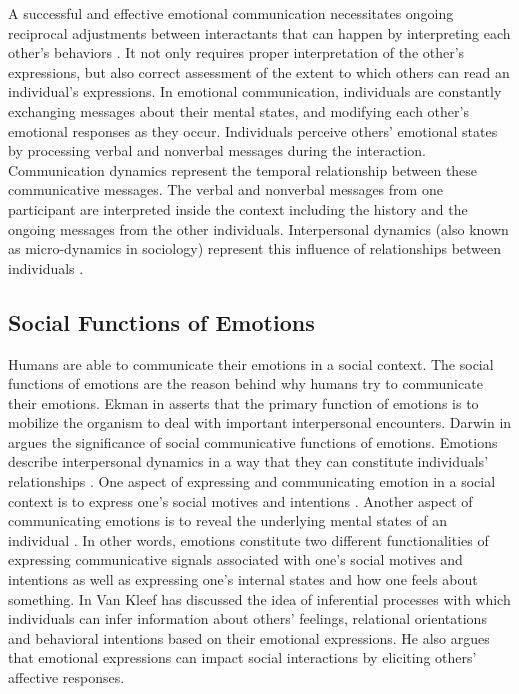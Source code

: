 \documentclass[12pt]{report}
\begin{document}
A successful and effective emotional communication necessitates ongoing
reciprocal adjustments between interactants that can happen by interpreting each
other's behaviors \cite{parkinson:emotion-social-interaction}. It not only
requires proper interpretation of the other's expressions, but also correct
assessment of the extent to which others can read an individual's expressions.
In emotional communication, individuals are constantly exchanging messages about
their mental states, and modifying each other's emotional responses as they
occur. Individuals perceive others' emotional states by processing verbal and
nonverbal messages during the interaction. Communication dynamics represent the
temporal relationship between these communicative messages. The verbal and
nonverbal messages from one participant are interpreted inside the context
including the history and the ongoing messages from the other individuals.
Interpersonal dynamics (also known as micro-dynamics in sociology) represent
this influence of relationships between individuals
\cite{louis:communication-dynamic}.

\subsection{Social Functions of Emotions}
\label{section-emotion-social-functions}

Humans are able to communicate their emotions in a social context. The social
functions of emotions are the reason behind why humans try to communicate their
emotions. Ekman in \cite{ekman:argument-emotions} asserts that the primary
function of emotions is to mobilize the organism to deal with important
interpersonal encounters. Darwin in \cite{darwin:emotion-expression} argues the
significance of social communicative functions of emotions. Emotions describe
interpersonal dynamics in a way that they can constitute individuals'
relationships \cite{parkinson:emotions-social, tiedens:social-life}. One aspect
of expressing and communicating emotion in a social context is to express one's
social motives and intentions \cite{hess:darwin-emotion}. Another aspect of
communicating emotions is to reveal the underlying mental states of an
individual \cite{parkinson:emotion-communication}. In other words, emotions
constitute two different functionalities of expressing communicative signals
associated with one's social motives and intentions as well as expressing one's
internal states and how one feels about something. In
\cite{kleef:emotion-regulate-social} Van Kleef has discussed the idea of
inferential processes with which individuals can infer information about others'
feelings, relational orientations and behavioral intentions based on their
emotional expressions. He also argues that emotional expressions can impact
social interactions by eliciting others' affective responses.
\end{document}
